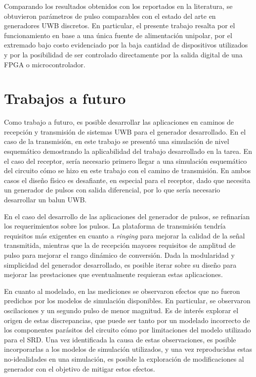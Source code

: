 Comparando los resultados obtenidos con los reportados en la literatura, se
obtuvieron parámetros de pulso comparables con el estado del arte en generadores
UWB discretos. En particular, el presente trabajo resalta por el funcionamiento
en base a una única fuente de alimentación unipolar, por el extremado bajo costo
evidenciado por la baja cantidad de dispositivos utilizados y por la posibilidad
de ser controlado directamente por la salida digital de una FPGA o
microcontrolador.

\section{Trabajos a futuro}

Como trabajo a futuro, es posible desarrollar las aplicaciones en caminos de
recepción y transmisión de sistemas UWB para el generador desarrollado. En el
caso de la transmisión, en este trabajo se presentó una simulación de nivel
esquemático demostrando la aplicabilidad del trabajo desarrollado en la tarea.
En el caso del receptor, sería necesario primero llegar a una simulación
esquemático del circuito cómo se hizo en este trabajo con el camino de
transmisión. En ambos casos el diseño físico es desafiante, en especial para el
receptor, dado que necesita un generador de pulsos con salida diferencial, por
lo que sería necesario desarrollar un balun UWB.

En el caso del desarrollo de las aplicaciones del generador de pulsos, se
refinarían los requerimientos sobre los pulsos. La plataforma de transmisión
tendría requisitos más exigentes en cuanto a \textit{ringing} para mejorar la
calidad de la señal transmitida, mientras que la de recepción
mayores requisitos de amplitud de pulso para mejorar el rango dinámico de
conversión. Dada la modularidad y simplicidad del generador desarrollado, es
posible iterar sobre su diseño para mejorar las prestaciones que eventualmente
requieran estas aplicaciones.

En cuanto al modelado, en las mediciones se observaron efectos que no fueron
predichos por los modelos de simulación disponibles. En particular, se
observaron oscilaciones y un segundo pulso de menor magnitud. Es de interés
explorar el origen de estas discrepancias, que puede ser tanto por un modelado
incorrecto de los componentes parásitos del circuito cómo por limitaciones del
modelo utilizado para el SRD. Una vez identificada la causa de estas
observaciones, es posible incorporarlas a los modelos de simulación utilizados,
y una vez reproducidas estas no-idealidades en una simulación, es posible la
exploración de modificaciones al generador con el objetivo de mitigar estos
efectos.
